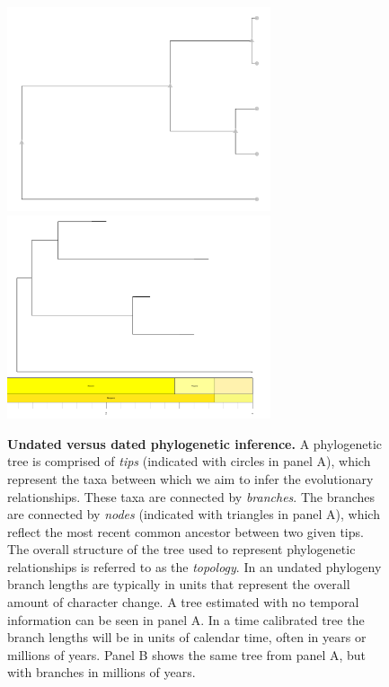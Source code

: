 \documentclass[11pt]{article}
\newcommand{\rw}[1]{{\textcolor{red}{[RW: #1]}}} %
\begin{document}
\begin{figure}[h!]

\centering

\includegraphics[height=6cm, width=7.75cm]{figures/UnscaledTree.pdf} \includegraphics[height=6cm, width=7.75cm]{figures/Scaley.pdf}
\label{fig:undated}

\caption{\textbf{Undated versus dated phylogenetic inference.}
A phylogenetic tree is comprised of \textit{tips} (indicated with circles in panel A), which represent the taxa between which we aim to infer the evolutionary relationships.
These taxa are connected by \textit{branches}. %
The branches are connected by \textit{nodes} (indicated with triangles in panel A), which reflect the most recent common ancestor between two given tips. 
The overall structure of the tree used to represent phylogenetic relationships is referred to as the \textit{topology}.
In an undated phylogeny branch lengths are typically in units that represent the overall amount of character change.
A tree estimated with no temporal information can be seen in panel A.
In a time calibrated tree %
the branch lengths will be in units of calendar time, often in years or millions of years. %
Panel B shows the same tree from panel A, but with branches in millions of years.}

\end{figure}
\clearpage
\end{document}
